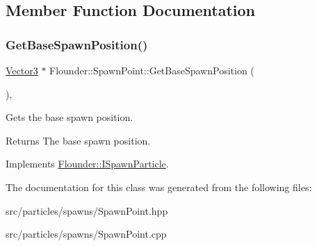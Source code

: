 \subsection{Member Function Documentation}
\mbox{\label{class_flounder_1_1_spawn_point_a0bb1e9ba2fd2bce734de6dbb16246fd4}} 
\subsubsection{\texorpdfstring{Get\+Base\+Spawn\+Position()}{GetBaseSpawnPosition()}}
{\footnotesize\ttfamily \hyperlink{class_flounder_1_1_vector3}{Vector3} $\ast$ Flounder\+::\+Spawn\+Point\+::\+Get\+Base\+Spawn\+Position (\begin{DoxyParamCaption}{ }\end{DoxyParamCaption})\hspace{0.3cm}{\ttfamily [override]}, {\ttfamily [virtual]}}



Gets the base spawn position. 

\begin{DoxyReturn}{Returns}
The base spawn position. 
\end{DoxyReturn}


Implements \hyperlink{class_flounder_1_1_i_spawn_particle_ac4adda7b65431918162f52ac1f4ce57d}{Flounder\+::\+I\+Spawn\+Particle}.



The documentation for this class was generated from the following files\+:\begin{DoxyCompactItemize}
\item 
src/particles/spawns/Spawn\+Point.\+hpp\item 
src/particles/spawns/Spawn\+Point.\+cpp\end{DoxyCompactItemize}
